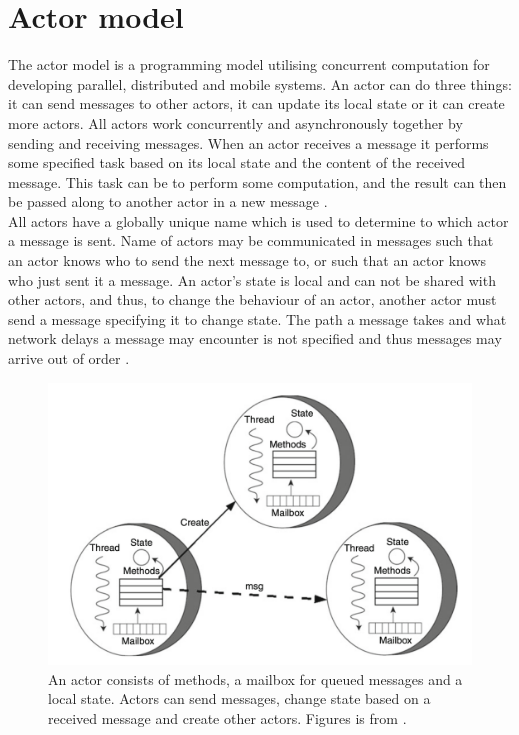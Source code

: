 \section{Actor model}
The actor model is a programming model utilising concurrent computation for developing parallel, distributed and mobile systems. An actor can do three things: it can send messages to other actors, it can update its local state or it can create more actors. All actors work concurrently and asynchronously together by sending and receiving messages. When an actor receives a message it performs some specified task based on its local state and the content of the received message. This task can be to perform some computation, and the result can then be passed along to another actor in a new message \cite{ActorModelPaper}.\\
All actors have a globally unique name which is used to determine to which actor a message is sent. Name of actors may be communicated in messages such that an actor knows who to send the next message to, or such that an actor knows who just sent it a message. An actor's state is local and can not be shared with other actors, and thus, to change the behaviour of an actor, another actor must send a message specifying it to change state. The path a message takes and what network delays a message may encounter is not specified and thus messages may arrive out of order \cite{ActorModelPaper}.\\
\begin{figure}[H]
	\centering
	\includegraphics[width=0.85\linewidth]{Materials/ActorModel/AMDemonstrated}
	\caption{An actor consists of methods, a mailbox for queued messages and a local state. Actors can send messages, change state based on a received message and create other actors. Figures is from \cite{ActorModelPaper}.}
	\label{AMDemonstrated}
\end{figure}
